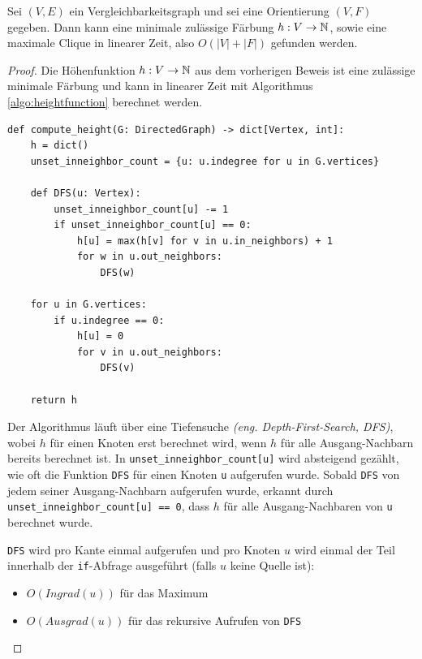 \documentclass[../main.tex]{subfiles}
\begin{document}
\begin{korollar}
    Sei $(V, E)$ ein Vergleichbarkeitsgraph und sei eine Orientierung $(V, F)$ gegeben. Dann kann eine minimale zulässige Färbung $h : V \to \mathbb{N}$, sowie eine maximale Clique in linearer Zeit, also $O(|V| + |F|)$ gefunden werden.
\end{korollar}
\begin{proof}
    
    Die Höhenfunktion $h: V \to \mathbb{N}$ aus dem vorherigen Beweis ist eine zulässige minimale Färbung und kann in linearer Zeit mit Algorithmus \ref{algo:heightfunction} berechnet werden.
    
    \begin{listing}[ht]
        \label{algo:heightfunction}
        \centering
        \begin{verbatim}
def compute_height(G: DirectedGraph) -> dict[Vertex, int]:
    h = dict()
    unset_inneighbor_count = {u: u.indegree for u in G.vertices}
    
    def DFS(u: Vertex):
        unset_inneighbor_count[u] -= 1
        if unset_inneighbor_count[u] == 0:
            h[u] = max(h[v] for v in u.in_neighbors) + 1
            for w in u.out_neighbors:
                DFS(w)
        
    for u in G.vertices:
        if u.indegree == 0:
            h[u] = 0
            for v in u.out_neighbors:
                DFS(v)
    
    return h
        \end{verbatim}
        \caption{Pseudo-Pseudo-Code zur Berechnung der Höhenfunktion. Details zur Implementierung gibt es in Appendix \ref{appendix:code}.}
    \end{listing}
    
    Der Algorithmus läuft über eine Tiefensuche \emph{(eng. Depth-First-Search, DFS)}, wobei $h$ für einen Knoten erst berechnet wird, wenn $h$ für alle Ausgang-Nachbarn bereits berechnet ist. In \verb|unset_inneighbor_count[u]| wird absteigend gezählt, wie oft die Funktion \verb|DFS| für einen Knoten \verb|u| aufgerufen wurde. Sobald \verb|DFS| von jedem seiner Ausgang-Nachbarn aufgerufen wurde, erkannt durch \verb|unset_inneighbor_count[u] == 0|, dass $h$ für alle Ausgang-Nachbaren von \verb|u| berechnet wurde.
    
    \verb|DFS| wird pro Kante einmal aufgerufen und pro Knoten $u$ wird einmal der Teil innerhalb der \verb|if|-Abfrage ausgeführt (falls $u$ keine Quelle ist):
    \begin{itemize}
        \item $O(Ingrad(u))$ für das Maximum
        \item $O(Ausgrad(u))$ für das rekursive Aufrufen von \verb|DFS|
    \end{itemize}
    

\end{proof}
\end{document}
